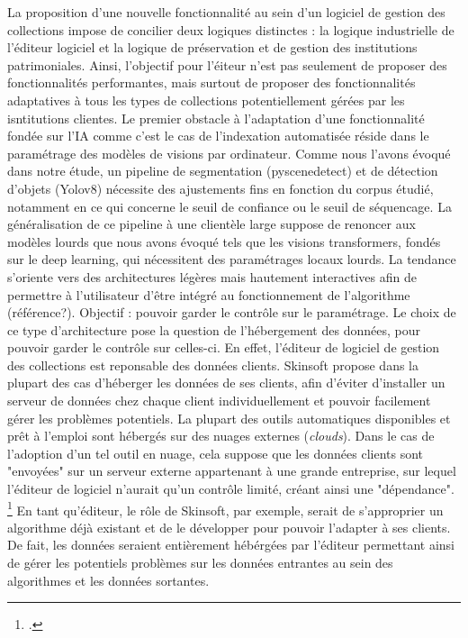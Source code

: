 La proposition d'une nouvelle fonctionnalité au sein d'un logiciel de gestion des collections impose de concilier deux logiques distinctes : la logique industrielle de l'éditeur logiciel et la logique de préservation et de gestion des institutions patrimoniales. Ainsi, l'objectif pour l'éiteur n'est pas seulement de proposer des fonctionnalités performantes, mais surtout de proposer des fonctionnalités adaptatives à tous les types de collections potentiellement gérées par les isntitutions clientes. 
Le premier obstacle à l'adaptation d'une fonctionnalité fondée sur l'IA comme c'est le cas de l'indexation automatisée réside dans le paramétrage des modèles de visions par ordinateur. Comme nous l'avons évoqué dans notre étude, un pipeline de segmentation (pyscenedetect) et de détection d'objets (Yolov8) nécessite des ajustements fins en fonction du corpus étudié, notamment en ce qui concerne le seuil de confiance ou le seuil de séquencage. La généralisation de ce pipeline à une clientèle large suppose de renoncer aux modèles lourds que nous avons évoqué tels que les visions transformers, fondés sur le deep learning, qui nécessitent des paramétrages locaux lourds. La tendance s'oriente vers des architectures légères mais hautement interactives afin de permettre à l'utilisateur d'être intégré au fonctionnement de l'algorithme (référence?). Objectif : pouvoir garder le contrôle sur le paramétrage.
Le choix de ce type d'architecture pose la question de l'hébergement des données, pour pouvoir garder le contrôle sur celles-ci. En effet, l'éditeur de logiciel de gestion des collections est reponsable des données clients. Skinsoft propose dans la plupart des cas d'héberger les données de ses clients, afin d'éviter d'installer un serveur de données chez chaque client individuellement et pouvoir facilement gérer les problèmes potentiels. La plupart des outils automatiques disponibles et prêt à l'emploi sont hébergés sur des nuages externes (\textit{clouds}). Dans le cas de l'adoption d'un tel outil en nuage, cela suppose que les données clients sont "envoyées" sur un serveur externe appartenant à une grande entreprise, sur lequel l'éditeur de logiciel n'aurait qu'un contrôle limité, créant ainsi une "dépendance". \footcite{zotero-item-584} En tant qu'éditeur, le rôle de Skinsoft, par exemple, serait de s'approprier un algorithme déjà existant et de le développer pour pouvoir l'adapter à ses clients. De fait, les données seraient entièrement hébérgées par l'éditeur permettant ainsi de gérer les potentiels problèmes sur les données entrantes au sein des algorithmes et les données sortantes. 

